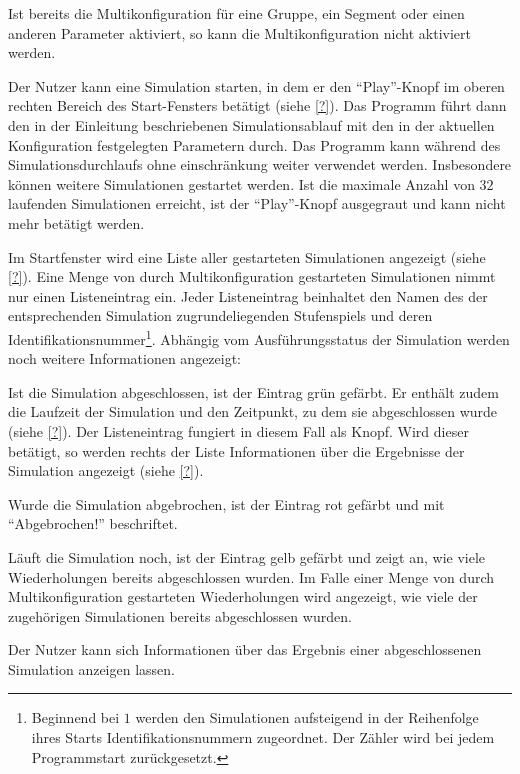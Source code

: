 \documentclass[parskip=full,11pt]{scrartcl}
\begin{document}
Ist bereits die Multikonfiguration für eine Gruppe, ein Segment oder einen anderen Parameter aktiviert, so kann die Multikonfiguration nicht aktiviert werden.

Der Nutzer kann eine Simulation starten, in dem er den \enquote{Play}-Knopf im oberen rechten Bereich des Start-Fensters betätigt (siehe \cref{?}). Das Programm führt dann den in der Einleitung beschriebenen Simulationsablauf mit den in der aktuellen Konfiguration festgelegten Parametern durch. Das Programm kann während des Simulationsdurchlaufs ohne einschränkung weiter verwendet werden. Insbesondere können weitere Simulationen gestartet werden. Ist die maximale Anzahl von \(32\) laufenden Simulationen erreicht, ist der \enquote{Play}-Knopf ausgegraut und kann nicht mehr betätigt werden.

Im Startfenster wird eine Liste aller gestarteten Simulationen angezeigt (siehe \cref{?}). Eine Menge von durch Multikonfiguration gestarteten Simulationen nimmt nur einen Listeneintrag ein. Jeder Listeneintrag beinhaltet den Namen des der entsprechenden Simulation zugrundeliegenden Stufenspiels und deren Identifikationsnummer\footnote{Beginnend bei \(1\) werden den Simulationen aufsteigend in der Reihenfolge ihres Starts Identifikationsnummern zugeordnet. Der Zähler wird bei jedem Programmstart zurückgesetzt.}. Abhängig vom Ausführungsstatus der Simulation werden noch weitere Informationen angezeigt:

Ist die Simulation abgeschlossen, ist der Eintrag grün gefärbt. Er enthält zudem die Laufzeit der Simulation und den Zeitpunkt, zu dem sie abgeschlossen wurde (siehe \cref{?}). Der Listeneintrag fungiert in diesem Fall als Knopf. Wird dieser betätigt, so werden rechts der Liste Informationen über die Ergebnisse der Simulation angezeigt (siehe \cref{?}).

Wurde die Simulation abgebrochen, ist der Eintrag rot gefärbt und mit \enquote{Abgebrochen!} beschriftet.

Läuft die Simulation noch, ist der Eintrag gelb gefärbt und zeigt an, wie viele Wiederholungen bereits abgeschlossen wurden. Im Falle einer Menge von durch Multikonfiguration gestarteten Wiederholungen wird angezeigt, wie viele der zugehörigen Simulationen bereits abgeschlossen wurden.

Der Nutzer kann sich Informationen über das Ergebnis einer abgeschlossenen Simulation anzeigen lassen.
\end{document}
